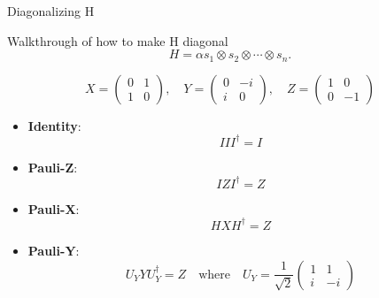 \documentclass[aspectratio=169,xcolor=dvipsnames]{beamer}
\begin{document}
\begin{frame}{Diagonalizing H}
  \begin{block}{Walkthrough of how to make H diagonal}
    \begin{equation*}
      H = \alpha s_1 \otimes s_2 \otimes \cdots \otimes s_n.
    \end{equation*}
  \end{block}
  \begin{equation*}
    X = \begin{pmatrix} 0 & 1 \\ 1 & 0 \end{pmatrix}, \quad
    Y = \begin{pmatrix} 0 & -i \\ i & 0 \end{pmatrix}, \quad
    Z = \begin{pmatrix} 1 & 0 \\ 0 & -1 \end{pmatrix}
  \end{equation*}

  \begin{itemize}
  \item \textbf{Identity}:
    \begin{equation*}
      I I I^\dagger = I
    \end{equation*}

  \item \textbf{Pauli-Z}:
    \begin{equation*}
      I Z I^\dagger = Z
    \end{equation*}
  \item \textbf{Pauli-X}:
    \begin{equation*}
      HXH^{\dagger} = Z
    \end{equation*}

  \item \textbf{Pauli-Y}:
    \begin{equation*}
      U_Y Y U_Y^\dagger = Z \quad \text{where} \quad U_Y = \frac{1}{\sqrt{2}}\begin{pmatrix} 1 & 1 \\ i & -i \end{pmatrix}
    \end{equation*}

  \end{itemize}

  
\end{frame}
\end{document}
